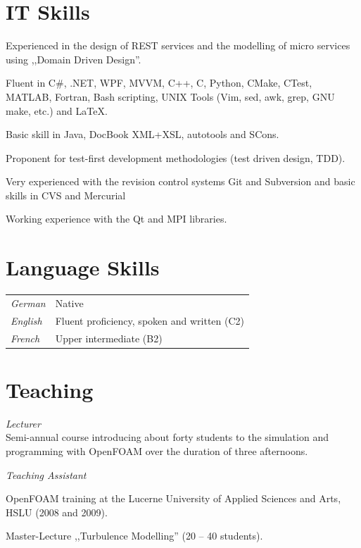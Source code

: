 \documentclass[line,11pt,a4paper]{../resume}
\begin{document}
\begin{resume}
\pagebreak
\section{\mysidestyle IT Skills}\vspace{6mm}
\begin{list2}
  \item Experienced in the design of REST services and the modelling of micro
    services using ,,Domain Driven Design''.
  \item Fluent in C\#, .NET, WPF, MVVM, C++, C, Python, CMake, CTest, MATLAB,
    Fortran, Bash scripting, UNIX Tools (Vim, sed, awk, grep, GNU make, etc.)
    and {\selectfont\LaTeX}.
  \item Basic skill in Java, DocBook XML+XSL, autotools and SCons.
  \item Proponent for test-first development methodologies (test driven design,
    TDD).
  \item Very experienced with the revision control systems Git and Subversion
    and basic skills in CVS and Mercurial
  \item Working experience with the Qt and MPI libraries.
\end{list2}

\section{\mysidestyle Language Skills}\vspace{2mm}
\begin{tabular}{@{}ll}
  \textsl{German}   & Native \\
  \textsl{English}  & Fluent proficiency, spoken and written (C2) \\
  \textsl{French}  & Upper intermediate (B2) \\
\end{tabular}

\section{\mysidestyle Teaching}\vspace{2mm}

\textsl{Lecturer}\\
Semi-annual course introducing about forty students to the simulation and
programming with OpenFOAM over the duration of three afternoons.

\textsl{Teaching Assistant}
\begin{list2}
\item OpenFOAM training at the Lucerne University of Applied Sciences and Arts, HSLU
(2008 and 2009).
\item Master-Lecture ,,Turbulence Modelling'' (20 -- 40 students).
\end{list2}


\end{resume}
\end{document}
